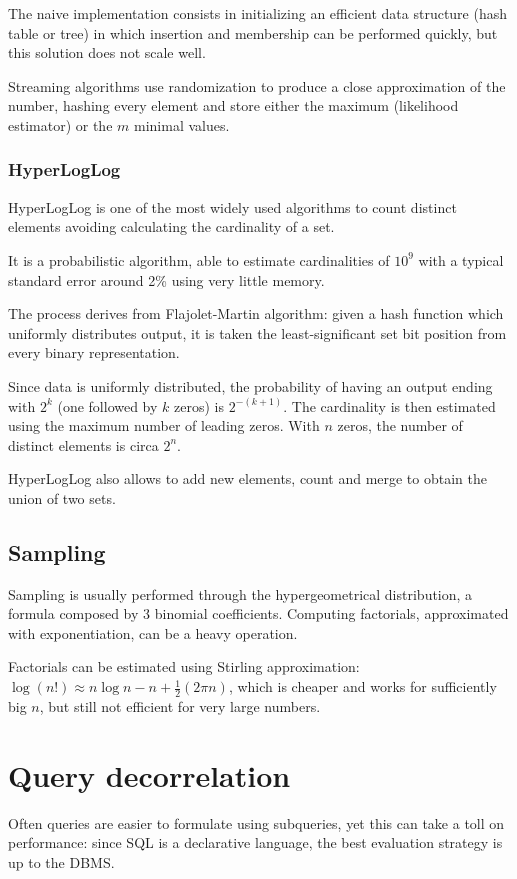 The naive implementation consists in initializing an efficient data structure (hash table or tree) in which insertion and membership can be performed quickly, but this solution does not scale well.

Streaming algorithms use randomization to produce a close approximation of the number, hashing every element and store either the maximum (likelihood estimator) or the $m$ minimal values.

\subsubsection{HyperLogLog}
HyperLogLog is one of the most widely used algorithms to count distinct elements avoiding calculating the cardinality of a set.

It is a probabilistic algorithm, able to estimate cardinalities of $10^{9}$ with a typical standard error around 2\% using very little memory. 

The process derives from Flajolet-Martin algorithm: given a hash function which uniformly distributes output, it is taken the least-significant set bit position from every binary representation. 

Since data is uniformly distributed, the probability of having an output ending with $2^k$ (one followed by $k$ zeros) is $2^{-(k+1)}$. The cardinality is then estimated using the maximum number of leading zeros. With $n$ zeros, the number of distinct elements is circa $2^n$.

HyperLogLog also allows to add new elements, count and merge to obtain the union of two sets.

\subsection{Sampling}
Sampling is usually performed through the hypergeometrical distribution, a formula composed by 3 binomial coefficients. Computing factorials, approximated with exponentiation, can be a heavy operation.

Factorials can be estimated using Stirling approximation: $\log(n!) \approx n\log n - n + \frac{1}{2}(2\pi n)$, which is cheaper and works for sufficiently big $n$, but still not efficient for very large numbers.

\section{Query decorrelation}
Often queries are easier to formulate using subqueries, yet this can take a toll on performance: since SQL is a declarative language, the best evaluation strategy is up to the DBMS.

